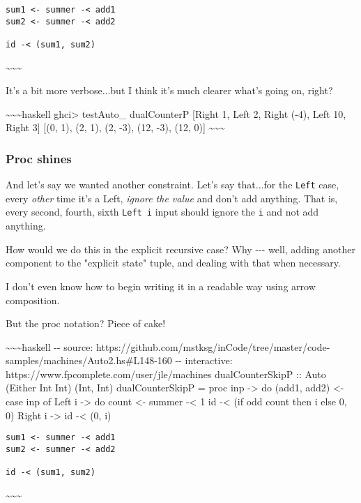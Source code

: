 \documentclass[]{article}
\begin{document}
\begin{verbatim}
sum1 <- summer -< add1
sum2 <- summer -< add2

id -< (sum1, sum2)
\end{verbatim}

\textasciitilde{}\textasciitilde{}\textasciitilde{}

It's a bit more verbose...but I think it's much clearer what's going on, right?

\textasciitilde{}\textasciitilde{}\textasciitilde{}haskell ghci\textgreater{}
testAuto\_ dualCounterP {[}Right 1, Left 2, Right (-4), Left 10, Right 3{]}
{[}(0, 1), (2, 1), (2, -3), (12, -3), (12, 0){]}
\textasciitilde{}\textasciitilde{}\textasciitilde{}

\subsubsection{Proc shines}

And let's say we wanted another constraint. Let's say that...for the
\texttt{Left} case, every \emph{other} time it's a Left, \emph{ignore the value}
and don't add anything. That is, every second, fourth, sixth \texttt{Left\ i}
input should ignore the \texttt{i} and not add anything.

How would we do this in the explicit recursive case? Why -\/-\/- well, adding
another component to the "explicit state" tuple, and dealing with that when
necessary.

I don't even know how to begin writing it in a readable way using arrow
composition.

But the proc notation? Piece of cake!

\textasciitilde{}\textasciitilde{}\textasciitilde{}haskell -\/- source:
https://github.com/mstksg/inCode/tree/master/code-samples/machines/Auto2.hs\#L148-160
-\/- interactive: https://www.fpcomplete.com/user/jle/machines dualCounterSkipP
:: Auto (Either Int Int) (Int, Int) dualCounterSkipP = proc inp -\textgreater{}
do (add1, add2) \textless{}- case inp of Left i -\textgreater{} do count
\textless{}- summer -\textless{} 1 id -\textless{} (if odd count then i else 0,
0) Right i -\textgreater{} id -\textless{} (0, i)

\begin{verbatim}
sum1 <- summer -< add1
sum2 <- summer -< add2

id -< (sum1, sum2)
\end{verbatim}

\textasciitilde{}\textasciitilde{}\textasciitilde{}
\end{document}
